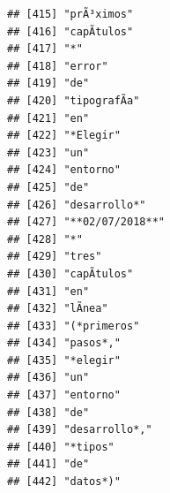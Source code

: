 \documentclass[
]{book}
\begin{document}
\begin{verbatim}
## [415] "prÃ³ximos"                                                                        
## [416] "capÃ­tulos"                                                                       
## [417] "*"                                                                                
## [418] "error"                                                                            
## [419] "de"                                                                               
## [420] "tipografÃ­a"                                                                      
## [421] "en"                                                                               
## [422] "*Elegir"                                                                          
## [423] "un"                                                                               
## [424] "entorno"                                                                          
## [425] "de"                                                                               
## [426] "desarrollo*"                                                                      
## [427] "**02/07/2018**"                                                                   
## [428] "*"                                                                                
## [429] "tres"                                                                             
## [430] "capÃ­tulos"                                                                       
## [431] "en"                                                                               
## [432] "lÃ­nea"                                                                           
## [433] "(*primeros"                                                                       
## [434] "pasos*,"                                                                          
## [435] "*elegir"                                                                          
## [436] "un"                                                                               
## [437] "entorno"                                                                          
## [438] "de"                                                                               
## [439] "desarrollo*,"                                                                     
## [440] "*tipos"                                                                           
## [441] "de"                                                                               
## [442] "datos*)"
\end{verbatim}
\end{document}
